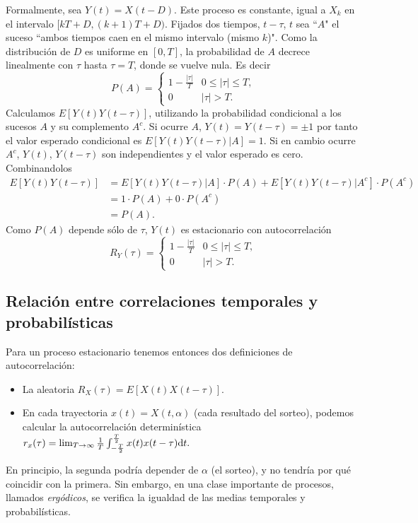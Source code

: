     Formalmente, sea $Y(t)=X(t-D)$. Este proceso es constante,
    igual a $X_k$ en el intervalo $[kT+D,(k+1)T+D)$.
Fijados dos tiempos, $t-\tau$, $t$ sea ``$A$" el
    suceso ``ambos tiempos caen en el mismo intervalo (mismo
    $k$)". Como la distribución de $D$ es uniforme en $[0,T]$, la probabilidad de
    $A$ decrece linealmente con $\tau$ hasta $\tau = T$, donde
    se vuelve nula. Es decir
    \[P(A) = \begin{cases}
                1-\frac{|\tau|}{T} & 0\leq |\tau|\leq T,\\
                0 & |\tau|>T.
            \end{cases}\]
Calculamos $E[Y(t)Y(t-\tau)]$, utilizando la probabilidad
condicional a los sucesos $A$ y su complemento $A^c$. Si ocurre
$A$, $Y(t)=Y(t-\tau)=\pm 1$ por tanto el valor esperado
condicional es  $E[Y(t)Y(t-\tau)|A]= 1$. Si en cambio ocurre
$A^c$, $Y(t)$, $ Y(t-\tau)$ son independientes y el valor esperado
es cero. Combinandolos
\begin{align*}
E[Y(t)Y(t-\tau)] & = E[Y(t)Y(t-\tau)|A] \cdot P(A) +
E[Y(t)Y(t-\tau)|A^c]\cdot P(A^c) \\
& = 1\cdot P(A)+0\cdot P(A^c)\\
&= P(A).
\end{align*}
Como $P(A)$ depende sólo de $\tau$, $Y(t)$ es estacionario con
autocorrelación \[ R_Y(\tau)=\begin{cases}
                1-\frac{|\tau|}{T} & 0\leq |\tau|\leq T,\\
                0 & |\tau|>T.
            \end{cases}\]

\subsection*{Relación entre correlaciones temporales y probabilísticas}

Para un proceso estacionario tenemos entonces dos definiciones de
autocorrelación:
\begin{itemize}
    \item La aleatoria $R_X(\tau)=E[X(t)X(t-\tau)]$.
    \item En cada trayectoria $x(t)= X(t,\alpha)$ (cada resultado del sorteo), podemos calcular la autocorrelación determinística
    $r_x(\tau) = \lim_{T\rightarrow\infty} \frac{1}{T}\int^{\frac{T}{2}}_{-\frac{T}{2}}
    x(t)x(t-\tau)\mathrm{d} t.$
\end{itemize}
En principio, la segunda podría depender de $\alpha$ (el sorteo),
y no tendría por qué coincidir con la primera. Sin embargo, en una
clase importante de procesos, llamados \emph{ergódicos}, se
verifica la igualdad de las medias temporales y probabilísticas.
%
%

